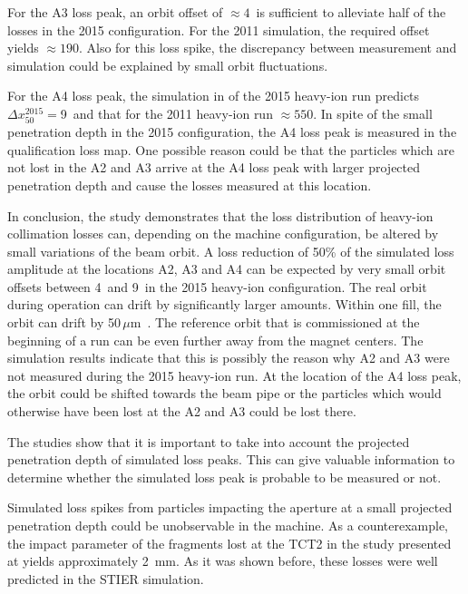 \vspace{0.2cm}

For the A3 loss peak, an orbit offset of $\approx 4$\mum\, is sufficient to alleviate half of the losses in the 2015 configuration. For the 2011 simulation, the required offset yields $\approx 190$\mum. Also for this loss spike, the discrepancy between measurement and simulation could be explained by small orbit fluctuations. 

\vspace{0.2cm}

For the A4 loss peak, the simulation in of the 2015 heavy-ion run predicts $\Delta x_{50}^{2015}=$9\mum\, and that for the 2011 heavy-ion run $\approx 550$\mum. In spite of the small penetration depth in the 2015 configuration, the A4 loss peak is measured in the qualification loss map. One possible reason could be that the particles which are not lost in the A2 and A3 arrive at the A4 loss peak with larger projected penetration depth and cause the losses measured at this location. 

\vspace{0.2cm}

In conclusion, the study demonstrates that the loss distribution of heavy-ion collimation losses can, depending on the machine configuration, be altered by small variations of the beam orbit.  A loss reduction of 50\% of the simulated loss amplitude at the locations A2, A3 and A4 can be expected by very small orbit offsets between 4\mum\, and 9\mum\, in the 2015 heavy-ion configuration. The real orbit during operation can drift by significantly larger amounts. Within one fill, the orbit can drift by 50\,$\mu$m~\cite{wenn:private}. The reference orbit that is commissioned at the beginning of a run can be even further away from the magnet centers. The simulation results indicate that this is possibly the reason why A2 and A3 were not measured during the 2015 heavy-ion run. At the location of the A4 loss peak, the orbit could be shifted towards the beam pipe or the particles which would otherwise have been lost at the A2 and A3 could be lost there. 

\vspace{0.2cm}

The studies show that it is important to take into account the projected penetration depth of simulated loss peaks. This can give valuable information to determine whether the simulated loss peak is probable to be measured or not. 

\newpage
Simulated loss spikes from particles impacting the aperture at a small projected penetration depth could be unobservable in the machine. As a counterexample, the impact parameter of the  fragments lost at the TCT2 in the study presented at  yields approximately 2~mm. As it was shown before, these losses were well predicted in the STIER simulation.

